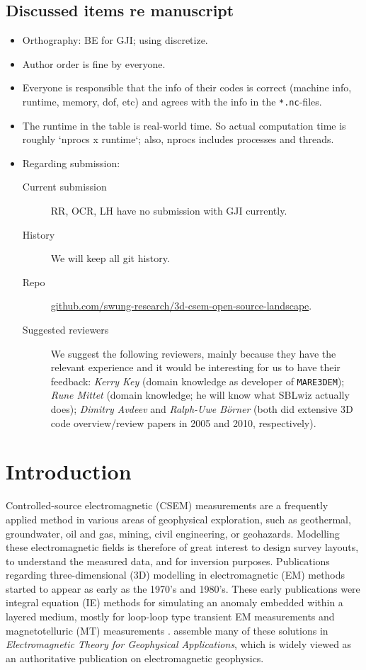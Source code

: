 \documentclass[
    paper,
  ]{geophysics}
\begin{document}
\subsection*{Discussed items re manuscript}
\begin{itemize}
  \item Orthography: BE for GJI; using discretize.
  \item Author order is fine by everyone.
  \item Everyone is responsible that the info of their codes is correct (machine info, runtime, memory, dof, etc) and agrees with the info in the \texttt{*.nc}-files.
  \item The runtime in the table is real-world time. So actual computation time is roughly `nprocs x runtime`; also, nprocs includes processes and threads.
  \item Regarding submission:
    \begin{description}
      \item[Current submission] RR, OCR, LH have no submission with GJI currently.
      \item[History] We will keep all git history.
      \item[Repo] \href{https://github.com/swung-research/3d-csem-open-source-landscape/}{github.com/swung-research/3d-csem-open-source-landscape}.
      \item[Suggested reviewers] We suggest the following reviewers, mainly because they have the relevant experience and it would be interesting for us to have their feedback: \emph{Kerry Key} (domain knowledge as developer of \texttt{MARE3DEM}); \emph{Rune Mittet} (domain knowledge; he will know what SBLwiz actually does); \emph{Dimitry Avdeev} and \emph{Ralph-Uwe Börner} (both did extensive 3D code overview/review papers in 2005 and 2010, respectively).
    \end{description}
\end{itemize}

\section{Introduction}

Controlled-source electromagnetic (CSEM) measurements are a frequently applied method in various areas of geophysical exploration, such as geothermal, groundwater, oil and gas, mining, civil engineering, or geohazards. Modelling these electromagnetic fields is therefore of great interest to design survey layouts, to understand the measured data, and for inversion purposes. Publications regarding three-dimensional (3D) modelling in electromagnetic (EM) methods started to appear as early as the 1970's and 1980's. These early publications were integral equation (IE) methods for simulating an anomaly embedded within a layered medium, mostly for loop-loop type transient EM measurements  \citep{GJI.74.Raiche, GEO.75.Hohmann, GJI.82.Das, GEO.86.Newman} and magnetotelluric (MT) measurements \citep{GEO.84.Wannamaker}. \cite{B.SEG.88.Ward} assemble many of these solutions in \emph{Electromagnetic Theory for Geophysical Applications}, which is widely viewed as an authoritative publication on electromagnetic geophysics.
\end{document}
